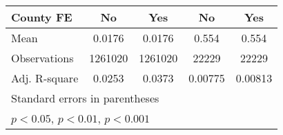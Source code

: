\begin{table}[htbp]
{\begin{tabular}{l*{4}{c}}
            County FE                                          & No                                   & Yes                                  & No                      & Yes                     \\
            \midrule
            Mean                                               & 0.0176                               & 0.0176                               & 0.554                   & 0.554                   \\
            Observations                                       & 1261020                              & 1261020                              & 22229                   & 22229                   \\
            Adj. R-square                                      & 0.0253                               & 0.0373                               & 0.00775                 & 0.00813                 \\
            \bottomrule
            \multicolumn{5}{l}{\footnotesize Standard errors in parentheses}                                                                                                                     \\
            \multicolumn{5}{l}{\footnotesize \sym{*} \(p<0.05\), \sym{**} \(p<0.01\), \sym{***} \(p<0.001\)}                                                                                     \\
        \end{tabular}
    }
\end{table}
